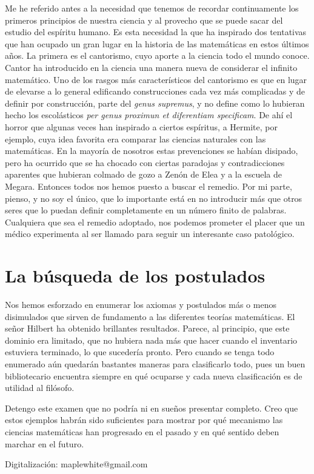 \documentclass[a4paper, 12pt]{article}
\begin{document}
Me he referido antes a la necesidad que tenemos de recordar continuamente
los primeros principios de nuestra ciencia y al provecho que se puede sacar
del estudio del espíritu humano. Es esta necesidad la que ha inspirado
dos tentativas que han ocupado un gran lugar en la historia de las matemáticas en estos últimos años. La primera es el cantorismo, cuyo
aporte a la ciencia todo el mundo conoce. Cantor ha introducido en la
ciencia una manera nueva de considerar el infinito matemático. Uno de
los rasgos más característicos del cantorismo es que en lugar de
elevarse a lo general edificando construcciones cada vez más complicadas
y de definir por construcción, parte del {\it genus supremus}, y no define
como lo hubieran hecho los escolásticos {\it per genus proximun et
diferentiam specificam}. De ahí el horror que algunas veces han
inspirado a ciertos espíritus, a Hermite, por ejemplo, cuya idea
favorita era comparar las ciencias naturales con las matemáticas. En la
mayoría de nosotros estas prevenciones se habían disipado, pero ha
ocurrido que se ha chocado con ciertas paradojas y contradicciones aparentes
que hubieran colmado de gozo a Zenón de Elea y a la escuela de Megara. Entonces todos
nos hemos puesto a buscar el remedio. Por mi parte, pienso, y no soy el único, que lo importante está en no introducir más que otros seres
que lo puedan definir completamente en un número finito de palabras.
Cualquiera que sea el remedio adoptado, nos podemos prometer el placer que
un médico experimenta al ser llamado para seguir un interesante caso
patológico.


\section*{La búsqueda de los postulados}


Nos hemos esforzado en enumerar los axiomas y postulados
más o menos disimulados que sirven de fundamento a las
diferentes teorías matemáticas. El señor Hilbert ha obtenido
brillantes resultados. Parece, al principio, que este dominio
era limitado, que no hubiera nada más que hacer cuando el
inventario estuviera terminado, lo que sucedería pronto.
Pero cuando se tenga todo enumerado aún quedarán bastantes
maneras para clasificarlo todo, pues un buen bibliotecario
encuentra siempre en qué ocuparse y cada nueva clasificación
es de  utilidad al filósofo.

Detengo este examen que no podría ni en sueños presentar
completo. Creo que estos ejemplos habrán sido suficientes
para mostrar por qué mecanismo las ciencias matemáticas han progresado
en el pasado y en qué sentido deben marchar en el futuro.


\bigskip
\begin{flushright}

Digitalización: maplewhite@gmail.com
\end{flushright}
\end{document}
